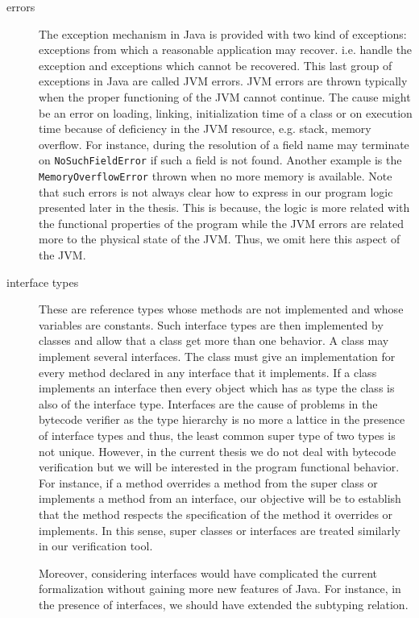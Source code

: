 \begin{description}
  
  \item [errors] The exception mechanism in Java is provided with two kind of exceptions: exceptions from which 
        a reasonable application may recover. i.e. handle the exception and exceptions which cannot be recovered. This last group
	of exceptions in Java are called JVM errors. JVM errors are  thrown typically when the proper functioning of the JVM cannot 
	continue. 
	The cause might be an error  on loading, linking, initialization time of a class or on execution time because of deficiency in the JVM resource, e.g.
	stack, memory overflow.
	For instance, during the resolution of a field name may terminate on \texttt{NoSuchFieldError} if 
	such a field is not found. Another example is the \texttt{MemoryOverflowError} thrown when no more memory is available.
	Note that such errors is not always clear how to express in our program logic presented later in the thesis. This is because, 
	the logic is more related with the functional properties of the program while the JVM errors are related more to the physical
	state of the JVM. Thus, we omit here this aspect of the JVM.
	 

   \item [interface types] These are reference types whose methods are not implemented and whose variables are constants.
         Such interface types are then implemented by classes and allow that a class get more than one behavior.
	 A class may implement several interfaces. 
	 The class must give an implementation for every method declared in any interface that it implements.
	 If a class implements an interface then every object which has as type the class is also of the interface type.
	 Interfaces  are the cause of  problems in the bytecode verifier as the type hierarchy is no more a lattice in the 
	 presence of interface types and thus,
	 the least common super type of two types is not unique.
	 However, in the current thesis we do not deal with bytecode verification but 
	 we will be interested in the program functional behavior. For instance, if a method overrides a method
	 from the super class or implements a method from an interface, our objective will be to establish that the method
	 respects the specification of the method it overrides or implements. In this sense, super classes or interfaces
	 are treated similarly in our verification tool.
  
	 Moreover, considering interfaces would have complicated the current formalization 
	 without gaining more new features of Java. 
	 For instance, in the presence of interfaces, we should have extended 
	 the subtyping relation. 


\end{description}

